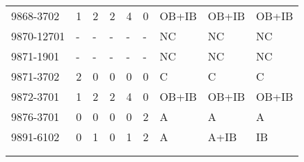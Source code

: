 \begin{longtable}{p{2.1cm}p{0.8cm}p{0.8cm}p{0.8cm}p{0.8cm}p{0.8cm}p{1.5cm}p{1.5cm}p{1.2cm}}
9868-3702 & 1 & 2 & 2 & 4 & 0 & OB+IB & OB+IB & OB+IB \\
9870-12701 & - & - & - & - & - & NC & NC & NC \\
9871-1901 & - & - & - & - & - & NC & NC & NC \\
9871-3702 & 2 & 0 & 0 & 0 & 0 & C & C & C \\
9872-3701 & 1 & 2 & 2 & 4 & 0 & OB+IB & OB+IB & OB+IB \\
9876-3701 & 0 & 0 & 0 & 0 & 2 & A & A & A \\
9891-6102 & 0 & 1 & 0 & 1 & 2 & A & A+IB & IB \\
 &  &  &  &  &  &  &  &  \\
 &  &  &  &  &  &  &  & 
\end{longtable}

